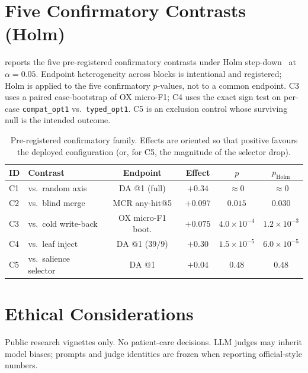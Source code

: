 \section{Five Confirmatory Contrasts (Holm)}
\label{app:holm}

 reports the five pre-registered confirmatory contrasts under Holm step-down~\cite{holm1979} at $\alpha{=}0.05$.
Endpoint heterogeneity across blocks is intentional and registered; Holm is applied to the five confirmatory $p$-values, not to a common endpoint.
C3 uses a paired case-bootstrap of OX micro-F1; C4 uses the exact sign test on per-case \texttt{compat\_opt1} vs.\ \texttt{typed\_opt1}.
C5 is an exclusion control whose surviving null is the intended outcome.

\begin{table}[t]
\centering
\small
\caption{Pre-registered confirmatory family. Effects are oriented so that positive favours the deployed configuration (or, for C5, the magnitude of the selector drop).}
\label{tab:holm5}
\begin{tabular}{llcccc}
\toprule
ID & Contrast & Endpoint & Effect & $p$ & $p_{\mathrm{Holm}}$ \\
\midrule
C1 & vs.\ random axis & DA @1 (full) & $+0.34$ & ${\approx}0$ & ${\approx}0$ \\
C2 & vs.\ blind merge & MCR any-hit@5 & $+0.097$ & $0.015$ & $0.030$ \\
C3 & vs.\ cold write-back & OX micro-F1 boot. & $+0.075$ & $4.0{\times}10^{-4}$ & $1.2{\times}10^{-3}$ \\
C4 & vs.\ leaf inject & DA @1 ($39/9$) & $+0.30$ & $1.5{\times}10^{-5}$ & $6.0{\times}10^{-5}$ \\
C5 & vs.\ salience selector & DA @1 & $+0.04$ & $0.48$ & $0.48$ \\
\bottomrule
\end{tabular}
\end{table}

\section{Ethical Considerations}
\label{app:ethics}

Public research vignettes only.
No patient-care decisions.
LLM judges may inherit model biases; prompts and judge identities are frozen when reporting official-style numbers.
